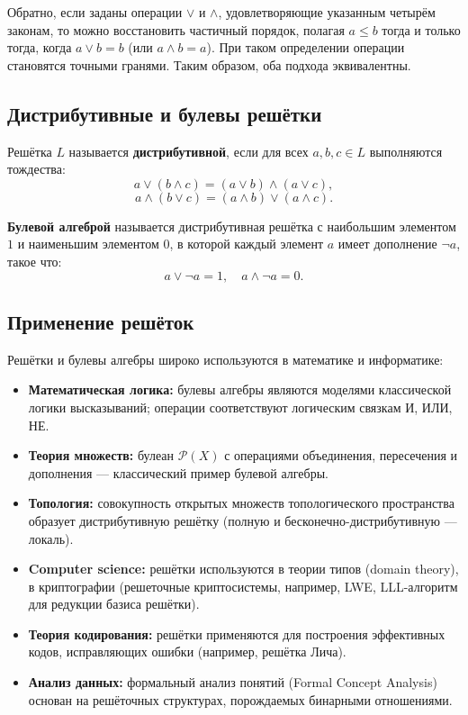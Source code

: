 \documentclass[10pt]{article}
\begin{document}
\begin{remark}
Обратно, если заданы операции $\vee$ и $\wedge$, удовлетворяющие указанным четырём законам, то можно восстановить частичный порядок, полагая $a \le b$ тогда и только тогда, когда $a \vee b = b$ (или $a \wedge b = a$). При таком определении операции становятся точными гранями. Таким образом, оба подхода эквивалентны.
\end{remark}

\subsection{Дистрибутивные и булевы решётки}
\begin{definition}
Решётка $L$ называется \textbf{дистрибутивной}, если для всех $a,b,c \in L$ выполняются тождества:
$$a \vee (b \wedge c) = (a \vee b) \wedge (a \vee c),$$
$$a \wedge (b \vee c) = (a \wedge b) \vee (a \wedge c).$$
\end{definition}

\begin{definition}
\textbf{Булевой алгеброй} называется дистрибутивная решётка с наибольшим элементом $1$ и наименьшим элементом $0$, в которой каждый элемент $a$ имеет дополнение $\neg a$, такое что:
$$a \vee \neg a = 1, \quad a \wedge \neg a = 0.$$
\end{definition}

\subsection*{Применение решёток}
Решётки и булевы алгебры широко используются в математике и информатике:
\begin{itemize}
    \item \textbf{Математическая логика:} булевы алгебры являются моделями классической логики высказываний; операции соответствуют логическим связкам И, ИЛИ, НЕ.
    \item \textbf{Теория множеств:} булеан $\mathcal{P}(X)$ с операциями объединения, пересечения и дополнения — классический пример булевой алгебры.
    \item \textbf{Топология:} совокупность открытых множеств топологического пространства образует дистрибутивную решётку (полную и бесконечно-дистрибутивную — локаль).
    \item \textbf{Computer science:} решётки используются в теории типов (domain theory), в криптографии (решеточные криптосистемы, например, LWE, LLL-алгоритм для редукции базиса решётки).
    \item \textbf{Теория кодирования:} решётки применяются для построения эффективных кодов, исправляющих ошибки (например, решётка Лича).
    \item \textbf{Анализ данных:} формальный анализ понятий (Formal Concept Analysis) основан на решёточных структурах, порождаемых бинарными отношениями.
\end{itemize}
\end{document}
